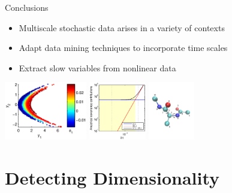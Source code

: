 \documentclass[12pt]{beamer}
\begin{document}
\begin{frame}{Conclusions}

\begin{itemize}
\item Multiscale stochastic data arises in a variety of contexts
\item Adapt data mining techniques to incorporate time scales
\item Extract slow variables from nonlinear data
\end{itemize}

\vfill

\includegraphics[height=1in]{data_nonlinear_NIV_dt1_kernel1}
\hfill
\includegraphics[height=1in]{C_dt_analytical_nonlinear2}
\hfill
\includegraphics[height=1in]{molecule2}

\end{frame}
\section{Detecting Dimensionality}
\end{document}
